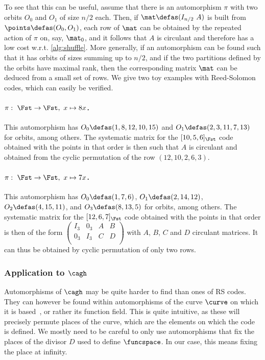 To see that this can be useful, assume that there is an automorphism $\pi$ with two orbits $O_0$ and $O_1$ of size $n/2$ each. Then, if $\mat \defas (I_{n/2}~A)$ is
built from $\points \defas (O_0, O_1)$, each row of $\mat$ can be obtained by the repeated action of $\pi$ on, say, $\mat_0$, and it follows
that $A$ is circulant and therefore has a low cost w.r.t. \autoref{alg:shuffle}. More generally, if an automorphism can be found such that it has orbits of sizes summing up to
$n/2$, and if the two partitions defined by the orbits have maximal rank, then the corresponding matrix $\mat$ can be deduced from a small set of rows. We give two toy examples with Reed-Solomon codes, which can easily be verified.

\paragraph{$\pi:~\Fst \rightarrow \Fst,~x \mapsto 8 x$.} This automorphism has $O_0\defas (1, 8, 12, 10, 15)$
and $O_1 \defas (2, 3, 11, 7, 13)$ for orbits, among others. The systematic matrix for the $[10, 5, 6]_{\Fst}$ code obtained with the points in that
order is then such that $A$ is circulant and obtained from the cyclic permutation of the row $(12, 10, 2, 6, 3)$.

\paragraph{$\pi:~\Fst \rightarrow \Fst,~x \mapsto 7 x$.} This automorphism has $O_0 \defas (1, 7, 6)$,
$O_1 \defas (2, 14, 12)$, $O_2 \defas (4, 15, 11)$, and $O_3 \defas (8, 13, 5)$ for orbits, among others.
The systematic matrix for the $[12, 6, 7]_{\Fst}$ code obtained with the points in that
order is then of the form
$\begin{pmatrix}
	I_3 & 0_3 & A & B \\
	0_3 & I_3 & C & D\\
\end{pmatrix}$ with $A$, $B$, $C$ and $D$ circulant matrices. It can thus be obtained by cyclic permutation of only two rows.

\medskip

\subsubsection{Application to $\cagh$}
Automorphisms of $\cagh$ may be quite harder to find than ones of RS codes. They can however
be found within automorphisms of the curve $\curve$ on which it is based~\cite{stichtenoth}, or rather its function field. This is quite intuitive, as these will precisely permute
places of the curve, which are the elements on which the code is defined. We mostly need to be careful to only use automorphisms that fix the places of the divisor
$D$ used to define $\funcspace$. In our case, this means fixing the place at infinity.

